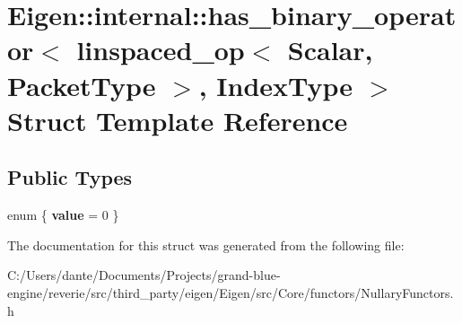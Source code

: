 \hypertarget{struct_eigen_1_1internal_1_1has__binary__operator_3_01linspaced__op_3_01_scalar_00_01_packet_type_01_4_00_01_index_type_01_4}{}\section{Eigen\+::internal\+::has\+\_\+binary\+\_\+operator$<$ linspaced\+\_\+op$<$ Scalar, Packet\+Type $>$, Index\+Type $>$ Struct Template Reference}
\label{struct_eigen_1_1internal_1_1has__binary__operator_3_01linspaced__op_3_01_scalar_00_01_packet_type_01_4_00_01_index_type_01_4}
\subsection*{Public Types}
\begin{DoxyCompactItemize}
\item 
\mbox{\label{struct_eigen_1_1internal_1_1has__binary__operator_3_01linspaced__op_3_01_scalar_00_01_packet_type_01_4_00_01_index_type_01_4_a30053931419dba35508de048a1dbc704}} 
enum \{ {\bfseries value} = 0
 \}
\end{DoxyCompactItemize}


The documentation for this struct was generated from the following file\+:\begin{DoxyCompactItemize}
\item 
C\+:/\+Users/dante/\+Documents/\+Projects/grand-\/blue-\/engine/reverie/src/third\+\_\+party/eigen/\+Eigen/src/\+Core/functors/Nullary\+Functors.\+h\end{DoxyCompactItemize}
